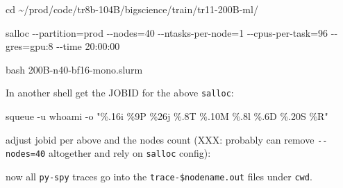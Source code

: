 \documentclass[
]{report}
\newenvironment{Shaded}{\begin{snugshade}}{\end{snugshade}}
\newcommand{\AttributeTok}[1]{\textcolor[rgb]{0.40,0.45,0.13}{#1}}
\newcommand{\BuiltInTok}[1]{\textcolor[rgb]{0.00,0.23,0.31}{#1}}
\newcommand{\ExtensionTok}[1]{\textcolor[rgb]{0.00,0.23,0.31}{#1}}
\newcommand{\FunctionTok}[1]{\textcolor[rgb]{0.28,0.35,0.67}{#1}}
\newcommand{\KeywordTok}[1]{\textcolor[rgb]{0.00,0.23,0.31}{#1}}
\newcommand{\NormalTok}[1]{\textcolor[rgb]{0.00,0.23,0.31}{#1}}
\newcommand{\OperatorTok}[1]{\textcolor[rgb]{0.37,0.37,0.37}{#1}}
\newcommand{\StringTok}[1]{\textcolor[rgb]{0.13,0.47,0.30}{#1}}
\begin{document}
\begin{Shaded}
\begin{Highlighting}[]
\BuiltInTok{cd}\NormalTok{ \textasciitilde{}/prod/code/tr8b{-}104B/bigscience/train/tr11{-}200B{-}ml/}

\ExtensionTok{salloc} \AttributeTok{{-}{-}partition}\OperatorTok{=}\NormalTok{prod }\AttributeTok{{-}{-}nodes}\OperatorTok{=}\NormalTok{40 }\AttributeTok{{-}{-}ntasks{-}per{-}node}\OperatorTok{=}\NormalTok{1 }\AttributeTok{{-}{-}cpus{-}per{-}task}\OperatorTok{=}\NormalTok{96 }\AttributeTok{{-}{-}gres}\OperatorTok{=}\NormalTok{gpu:8 }\AttributeTok{{-}{-}time}\NormalTok{ 20:00:00}

\FunctionTok{bash}\NormalTok{ 200B{-}n40{-}bf16{-}mono.slurm}
\end{Highlighting}
\end{Shaded}

In another shell get the JOBID for the above \texttt{salloc}:

\begin{Shaded}
\begin{Highlighting}[]
\ExtensionTok{squeue} \AttributeTok{{-}u} \KeywordTok{\textasciigrave{}}\FunctionTok{whoami}\KeywordTok{\textasciigrave{}} \AttributeTok{{-}o} \StringTok{"\%.16i \%9P \%26j \%.8T \%.10M \%.8l \%.6D \%.20S \%R"}
\end{Highlighting}
\end{Shaded}

adjust jobid per above and the nodes count (XXX: probably can remove
\texttt{-\/-nodes=40} altogether and rely on \texttt{salloc} config):

\begin{Shaded}
\end{Shaded}

now all \texttt{py-spy} traces go into the \texttt{trace-\$nodename.out}
files under \texttt{cwd}.
\end{document}
